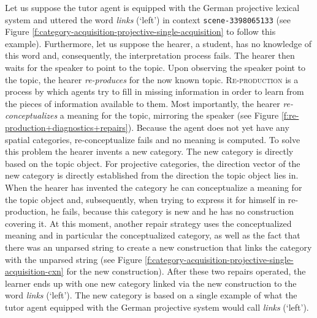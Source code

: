Let us suppose the tutor agent is equipped with the German projective 
lexical system and uttered the word \textit{links} (`left') in context {\footnotesize\tt scene-3398065133} 
(see Figure \ref{f:category-acquisition-projective-single-acquisition} 
to follow this example). Furthermore, let us suppose
the hearer, a student, has no knowledge of this word and, consequently, the interpretation
process fails. The hearer then waits for the speaker to point to the topic.
Upon observing the speaker point to the topic, the hearer \emph{re-produces}
for the now known topic. \textsc{Re-production} is a process by which agents try to fill 
in missing information in order to learn from the pieces of information available to them. 
Most importantly, the hearer \emph{re-conceptualizes}
a meaning for the topic, mirroring the speaker (see Figure \ref{f:re-production+diagnostics+repairs}). 
Because the agent does not yet have any spatial categories, re-conceptualize fails and 
no meaning is computed. To solve this problem the hearer invents a new category. 
The new category is directly based on the topic object. For projective categories, 
the direction vector of the new category is directly 
established from the direction the topic object lies in. When the hearer has invented 
the category he can conceptualize a meaning for the topic object and, subsequently, when trying to 
express it for himself in {re-production}, he fails, because this category is new
and he has no construction covering it. At this moment, another
repair strategy uses the conceptualized meaning and in particular the conceptualized
category, as well as the fact that there was an unparsed string to create a new 
construction that links the category with the unparsed string 
(see Figure \ref{f:category-acquisition-projective-single-acquisition-cxn} for
the new construction). After these two repairs operated, 
the learner ends up with one new category linked via the new construction to the 
word \textit{links} (`left'). The new category is based on a single example of what 
the tutor agent equipped with the German projective system would call \textit{links} (`left').

